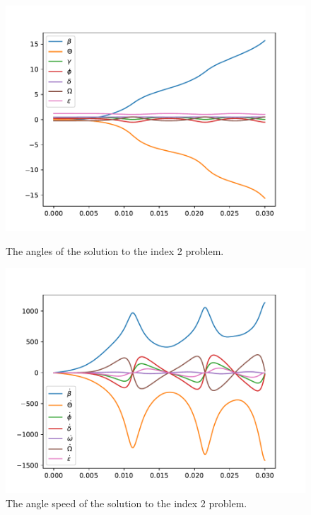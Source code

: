 \documentclass{report}
\begin{document}
\begin{figure}[h]
\centering
\begin{minipage}[b]{0.45\textwidth}
\centering
\includegraphics[width=\textwidth]{../Plots/Project2_main/Figure_510}
\caption{The angles of the solution to the index 2 problem.}
\label{pl:indx2_soln_angles}
\end{minipage}
\hfill
\begin{minipage}[b]{0.45\textwidth}
\centering
\includegraphics[width=\textwidth]{../Plots/Project2_main/Figure_511}
\caption{The angle speed of the solution to the index 2 problem.}
\label{pl:indx2_soln_anglesdot}
\end{minipage}
\end{figure}
\end{document}
